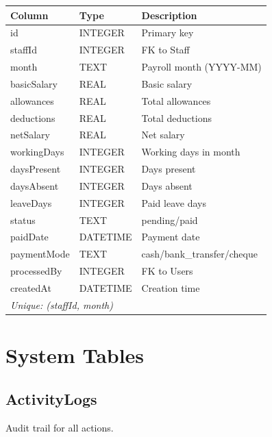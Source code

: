 \documentclass[12pt,a4paper]{report}
\begin{document}
\begin{longtable}{@{}p{4cm}p{2.5cm}p{6.5cm}@{}}
\toprule
\textbf{Column} & \textbf{Type} & \textbf{Description} \\
\midrule
\endhead
id & INTEGER & Primary key \\
staffId & INTEGER & FK to Staff \\
month & TEXT & Payroll month (YYYY-MM) \\
basicSalary & REAL & Basic salary \\
allowances & REAL & Total allowances \\
deductions & REAL & Total deductions \\
netSalary & REAL & Net salary \\
workingDays & INTEGER & Working days in month \\
daysPresent & INTEGER & Days present \\
daysAbsent & INTEGER & Days absent \\
leaveDays & INTEGER & Paid leave days \\
status & TEXT & pending/paid \\
paidDate & DATETIME & Payment date \\
paymentMode & TEXT & cash/bank\_transfer/cheque \\
processedBy & INTEGER & FK to Users \\
createdAt & DATETIME & Creation time \\
\multicolumn{3}{l}{\textit{Unique: (staffId, month)}} \\
\bottomrule
\end{longtable}

\chapter{System Tables}

\section{ActivityLogs}

Audit trail for all actions.
\end{document}
